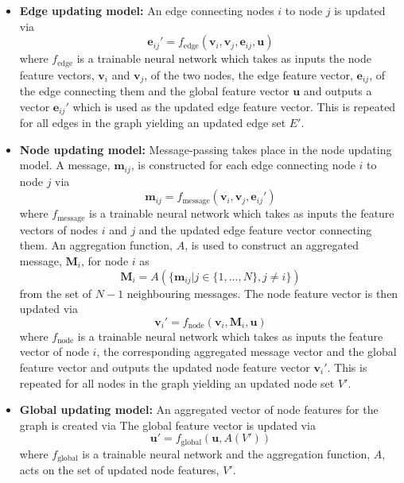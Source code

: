 \begin{itemize}
    \item \textbf{Edge updating model:} An edge connecting nodes $i$ to node $j$ is updated via
    \begin{equation}
        \textbf{e}_{ij}'=f_\mathrm{edge}(\textbf{v}_i,\textbf{v}_j,\textbf{e}_{ij}, \textbf{u})
    \end{equation}
    where $f_\mathrm{edge}$ is a trainable neural network which takes as inputs the node feature vectors, $\textbf{v}_i$ and $\textbf{v}_j$, of the two nodes, the edge feature vector, $\textbf{e}_{ij}$, of the edge connecting them and the global feature vector $\textbf{u}$ and outputs a vector $\textbf{e}_{ij}'$ which is used as the updated edge feature vector. This is repeated for all edges in the graph yielding an updated edge set $E'$.
    
    \item \textbf{Node updating model:} Message-passing takes place in the node updating model. A message, $\textbf{m}_{ij}$, is constructed for each edge connecting node $i$ to node $j$ via
    \begin{equation}
        \textbf{m}_{ij}=f_\mathrm{message}(\textbf{v}_i,\textbf{v}_j,\textbf{e}_{ij}')
    \end{equation}
    where $f_\mathrm{message}$ is a trainable neural network which takes as inputs the feature vectors of nodes $i$ and $j$ and the updated edge feature vector connecting them. An aggregation function, $A$, is used to construct an aggregated message, $\textbf{M}_i$, for node $i$ as
    \begin{equation}
        \textbf{M}_{i}=A(\{\textbf{m}_{ij}|j\in\{1,...,N\},j\neq i\})
    \end{equation}
    from the set of $N-1$ neighbouring messages. The node feature vector is then updated via
    \begin{equation}
        \textbf{v}_{i}'=f_\mathrm{node}(\textbf{v}_i,\textbf{M}_i,\textbf{u})
    \end{equation}
    where $f_\mathrm{node}$ is a trainable neural network which takes as inputs the feature vector of node $i$, the corresponding aggregated message vector and the global feature vector and outputs the updated node feature vector $\textbf{v}_{i}'$. This is repeated for all nodes in the graph yielding an updated node set $V'$.
    
    \item \textbf{Global updating model:} An aggregated vector of node features  for the graph is created via
    The global feature vector is updated via 
    \begin{equation}
        \textbf{u}'=f_\mathrm{global}(\textbf{u}, A(V'))
    \end{equation}
    where $f_\mathrm{global}$ is a trainable neural network and the aggregation function, $A$, acts on the set of updated node features, $V'$. 
\end{itemize}

